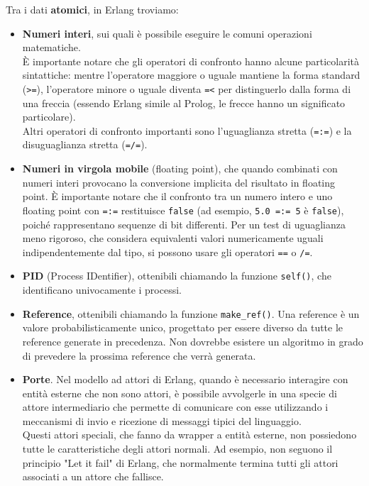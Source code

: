 \documentclass{article}
\begin{document}
Tra i dati \textbf{atomici}, in Erlang troviamo:
\begin{itemize}
    \item \textbf{Numeri interi}, sui quali è possibile eseguire le comuni operazioni matematiche.\\
    È importante notare che gli operatori di confronto hanno alcune particolarità sintattiche: mentre l'operatore maggiore o uguale mantiene la forma standard (\texttt{>=}), l'operatore minore o uguale diventa \texttt{=<} per distinguerlo dalla forma di una freccia (essendo Erlang simile al Prolog, le frecce hanno un significato particolare).\\
    Altri operatori di confronto importanti sono l'uguaglianza stretta (\texttt{=:=}) e la disuguaglianza stretta (\texttt{=/=}).
    \item \textbf{Numeri in virgola mobile} (floating point), che quando combinati con numeri interi provocano la conversione implicita del risultato in floating point. È importante notare che il confronto tra un numero intero e uno floating point con \texttt{=:=} restituisce \texttt{false} (ad esempio, \texttt{5.0 =:= 5} è \texttt{false}), poiché rappresentano sequenze di bit differenti. Per un test di uguaglianza meno rigoroso, che considera equivalenti valori numericamente uguali indipendentemente dal tipo, si possono usare gli operatori \texttt{==} o \texttt{/=}.
    \item \textbf{PID} (Process IDentifier), ottenibili chiamando la funzione \texttt{self()}, che identificano univocamente i processi.
    \item \textbf{Reference}, ottenibili chiamando la funzione \texttt{make\_ref()}. Una reference è un valore probabilisticamente unico, progettato per essere diverso da tutte le reference generate in precedenza. Non dovrebbe esistere un algoritmo in grado di prevedere la prossima reference che verrà generata.
    \item \textbf{Porte}. Nel modello ad attori di Erlang, quando è necessario interagire con entità esterne che non sono attori, è possibile avvolgerle in una specie di attore intermediario che permette di comunicare con esse utilizzando i meccanismi di invio e ricezione di messaggi tipici del linguaggio.\\
    Questi attori speciali, che fanno da wrapper a entità esterne, non possiedono tutte le caratteristiche degli attori normali. Ad esempio, non seguono il principio "Let it fail" di Erlang, che normalmente termina tutti gli attori associati a un attore che fallisce.\\

\end{itemize}
\end{document}
